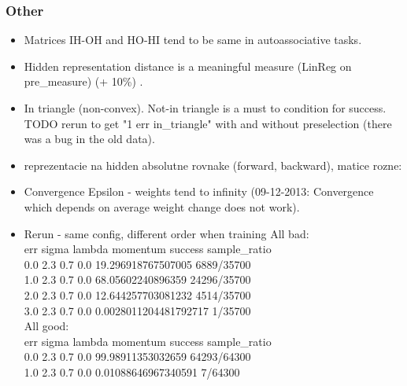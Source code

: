 
\subsubsection{Other}

\begin{itemize} 
\item Matrices IH-OH and HO-HI tend to be same in autoassociative tasks. 
\item Hidden representation distance is a meaningful measure (LinReg on pre\_measure) (+ 10\%) . 
\item In triangle (non-convex). Not-in triangle is a must to condition for success. \\
TODO rerun to get "1 err in\_triangle" with and without preselection (there was a bug in the old data). 
\item reprezentacie na hidden absolutne rovnake (forward, backward), matice rozne:
\item Convergence Epsilon - weights tend to infinity (09-12-2013: Convergence which depends on average weight change does not work). 
\item Rerun - same config, different order when training 
All bad: \\
err sigma lambda momentum success sample\_ratio \\
0.0 2.3 0.7 0.0 19.296918767507005 6889/35700 \\
1.0 2.3 0.7 0.0 68.05602240896359 24296/35700 \\
2.0 2.3 0.7 0.0 12.644257703081232 4514/35700 \\
3.0 2.3 0.7 0.0 0.0028011204481792717 1/35700 \\

All good:  \\
err sigma lambda momentum success sample\_ratio \\
0.0 2.3 0.7 0.0 99.98911353032659 64293/64300 \\
1.0 2.3 0.7 0.0 0.01088646967340591 7/64300 \\
\end{itemize}
